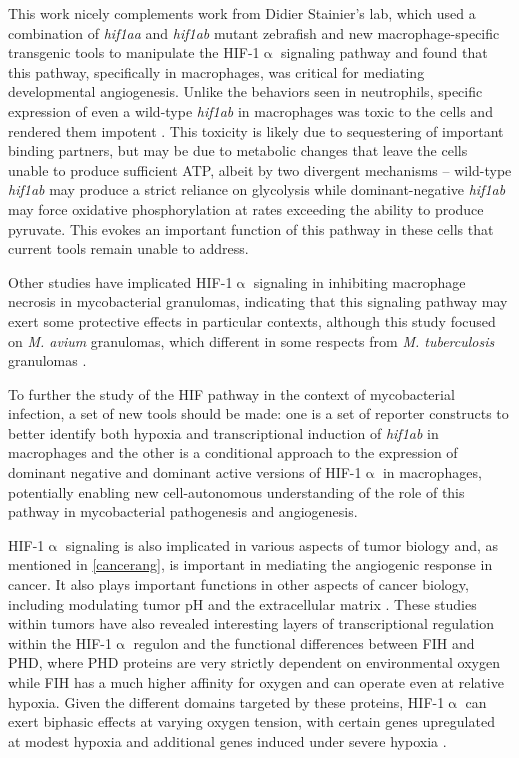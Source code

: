 This work nicely complements work from Didier Stainier's lab, which used a combination of \textit{hif1aa} and \textit{hif1ab} mutant zebrafish and new macrophage-specific transgenic tools to manipulate the HIF-1$\upalpha$ signaling pathway and found that this pathway, specifically in macrophages, was critical for mediating developmental angiogenesis. Unlike the behaviors seen in neutrophils, specific expression of even a wild-type \textit{hif1ab} in macrophages was toxic to the cells and rendered them impotent \citep{Gerri2017}. This toxicity is likely due to sequestering of important binding partners, but may be due to metabolic changes that leave the cells unable to produce sufficient ATP, albeit by two divergent mechanisms -- wild-type \textit{hif1ab} may produce a strict reliance on glycolysis while dominant-negative \textit{hif1ab} may force oxidative phosphorylation at rates exceeding the ability to produce pyruvate. This evokes an important function of this pathway in these cells that current tools remain unable to address. 

Other studies have implicated HIF-1$\upalpha$ signaling in inhibiting macrophage necrosis in mycobacterial granulomas, indicating that this signaling pathway may exert some protective effects in particular contexts, although this study focused on \textit{M. avium} granulomas, which different in some respects from \textit{M. tuberculosis} granulomas \citep{Cardoso2015}.

To further the study of the HIF pathway in the context of mycobacterial infection, a set of new tools should be made: one is a set of reporter constructs to better identify both hypoxia and transcriptional induction of \textit{hif1ab} in macrophages and the other is a conditional approach to the expression of dominant negative and dominant active versions of HIF-1$\upalpha$ in macrophages, potentially enabling new cell-autonomous understanding of the role of this pathway in mycobacterial pathogenesis and angiogenesis.

HIF-1$\upalpha$ signaling is also implicated in various aspects of tumor biology and, as mentioned in \autoref{cancerang}, is important in mediating the angiogenic response in cancer. It also plays important functions in other aspects of cancer biology, including modulating tumor pH and the extracellular matrix \citep{Dayan2008}. These studies within tumors have also revealed interesting layers of transcriptional regulation within the HIF-1$\upalpha$ regulon and the functional differences between FIH and PHD, where PHD proteins are very strictly dependent on environmental oxygen while FIH has a much higher affinity for oxygen and can operate even at relative hypoxia. Given the different domains targeted by these proteins, HIF-1$\upalpha$ can exert biphasic effects at varying oxygen tension, with certain genes upregulated at modest hypoxia and additional genes induced under severe hypoxia \citep{Dayan2008}.

